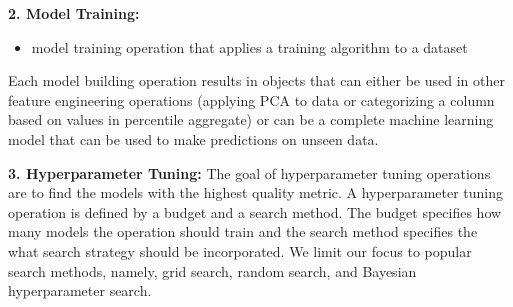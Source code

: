 \textbf{2. Model Training: }
\begin{itemize}
\item model training operation that applies a training algorithm to a dataset
\end{itemize}

Each model building operation results in objects that can either be used in other feature engineering operations (applying PCA to data or categorizing a column based on values in percentile aggregate) or can be a complete machine learning model that can be used to make predictions on unseen data.

\textbf{3. Hyperparameter Tuning:}
The goal of hyperparameter tuning operations are to find the models with the highest quality metric.
A hyperparameter tuning operation is defined by a budget and a search method.
The budget specifies how many models the operation should train and the search method specifies the what search strategy should be incorporated.
We limit our focus to popular search methods, namely, grid search, random search, and Bayesian hyperparameter search.

